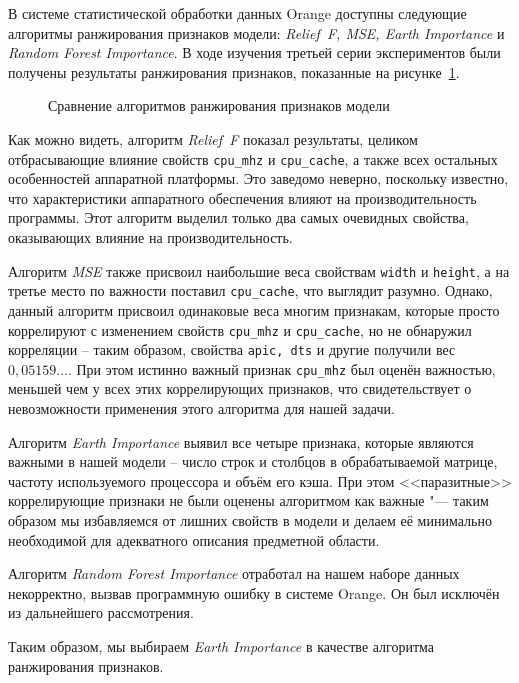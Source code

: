В системе статистической обработки данных Orange доступны следующие алгоритмы ранжирования признаков модели: \textit{Relief~F, MSE, Earth Importance} и \textit{Random Forest Importance}. В ходе изучения третьей серии экспериментов были получены результаты ранжирования признаков, показанные на рисунке~\ref{img:ranking-full}.

\begin{figure}[tbp]
    \caption{Сравнение алгоритмов ранжирования признаков модели}
    \label{img:ranking-full}
\end{figure}

Как можно видеть, алгоритм \textit{Relief~F} показал результаты, целиком отбрасывающие влияние свойств \texttt{cpu_mhz} и \texttt{cpu_cache}, а также всех остальных особенностей аппаратной платформы. Это заведомо неверно, поскольку известно, что характеристики аппаратного обеспечения влияют на производительность программы. Этот алгоритм выделил только два самых очевидных свойства, оказывающих влияние на производительность.

Алгоритм \textit{MSE} также присвоил наибольшие веса свойствам \texttt{width} и \texttt{height}, а на третье место по важности поставил \texttt{cpu_cache}, что выглядит разумно. Однако, данный алгоритм присвоил одинаковые веса многим признакам, которые просто коррелируют с изменением свойств \texttt{cpu_mhz} и \texttt{cpu_cache}, но не обнаружил корреляции -- таким образом, свойства \texttt{apic, dts} и другие получили вес $0,05159...$. При этом истинно важный признак \texttt{cpu_mhz} был оценён важностью, меньшей чем у всех этих коррелирующих признаков, что свидетельствует о невозможности применения этого алгоритма для нашей задачи.

Алгоритм \textit{Earth Importance} выявил все четыре признака, которые являются важными в нашей модели -- число строк и столбцов в обрабатываемой матрице, частоту используемого процессора и объём его кэша. При этом <<паразитные>> коррелирующие признаки не были оценены алгоритмом как важные "--- таким образом мы избавляемся от лишних свойств в модели и делаем её минимально необходимой для адекватного описания предметной области.

Алгоритм \textit{Random Forest Importance} отработал на нашем наборе данных некорректно, вызвав программную ошибку в системе Orange. Он был исключён из дальнейшего рассмотрения.

Таким образом, мы выбираем \textit{Earth Importance} в качестве алгоритма ранжирования признаков.

